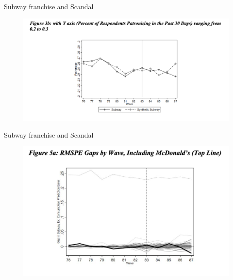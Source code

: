 \documentclass{beamer}
\begin{document}
\begin{frame}{Subway franchise and Scandal}

	\begin{figure}
	\includegraphics[scale=0.3]{./lecture_includes/subway_4.png}
	\end{figure}

\end{frame}

\begin{frame}{Subway franchise and Scandal}

	\begin{figure}
	\includegraphics[scale=0.35]{./lecture_includes/subway_5.png}
	\end{figure}

\end{frame}
\end{document}
